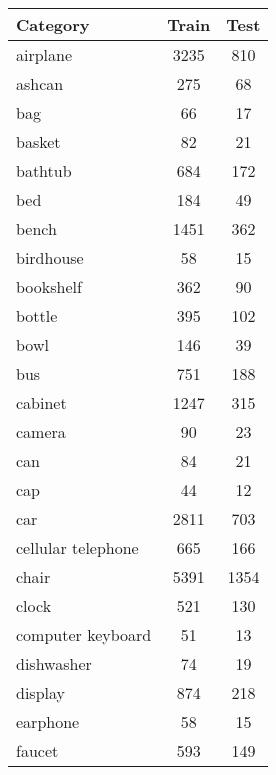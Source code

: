 \begin{table}[]
	\centering
	\begin{tabular}[t]{lcc}
		\hline
		\textbf{Category}  & \textbf{Train} & \textbf{Test} \\ \hline
		airplane           & 3235           & 810           \\
		ashcan             & 275            & 68            \\
		bag                & 66             & 17            \\
		basket             & 82             & 21            \\
		bathtub            & 684            & 172           \\
		bed                & 184            & 49            \\
		bench              & 1451           & 362           \\
		birdhouse          & 58             & 15            \\
		bookshelf          & 362            & 90            \\
		bottle             & 395            & 102           \\
		bowl               & 146            & 39            \\
		bus                & 751            & 188           \\
		cabinet            & 1247           & 315           \\
		camera             & 90             & 23            \\
		can                & 84             & 21            \\
		cap                & 44             & 12            \\
		car                & 2811           & 703           \\
		cellular telephone & 665            & 166           \\
		chair              & 5391           & 1354          \\
		clock              & 521            & 130           \\
		computer keyboard  & 51             & 13            \\
		dishwasher         & 74             & 19            \\
		display            & 874            & 218           \\
		earphone           & 58             & 15            \\
		faucet             & 593            & 149           \\

\end{tabular}
\end{table}
